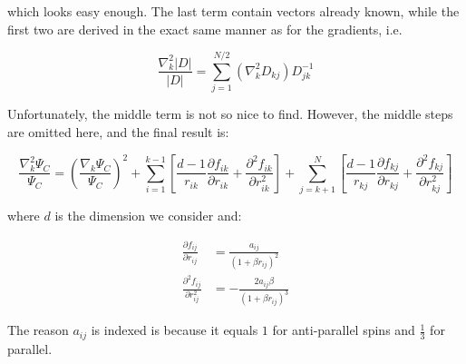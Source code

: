 \documentclass[english, a4paper]{article}
\begin{document}
which looks easy enough. The last term contain vectors already known, while the first two are derived in the exact same manner as for the gradients, i.e.

\begin{equation}
	\frac{\nabla_k^2|D|}{|D|} = \sum_{j=1}^{N/2}(\nabla_k^2D_{kj})D_{jk}^{-1}
\end{equation}

Unfortunately, the middle term is not so nice to find. However, the middle steps are omitted here, and the final result is:

\begin{equation}
	\frac{\nabla_k^2 \Psi_C}{\Psi_C} = \left(\frac{\nabla_k\Psi_C}{\Psi_C}\right)^2 + \sum_{i=1}^{k-1}\left[\frac{d-1}{r_{ik}}\frac{\partial f_{ik}}{\partial r_{ik}} + \frac{\partial^2 f_{ik}}{\partial r_{ik}^2}\right] + \sum_{j=k+1}^{N}\left[\frac{d-1}{r_{kj}}\frac{\partial f_{kj}}{\partial r_{kj}} + \frac{\partial^2 f_{kj}}{\partial r_{kj}^2}\right]
\end{equation}

where $d$ is the dimension we consider and:

\begin{align}
	\frac{\partial f_{ij}}{\partial r_{ij}} &= \frac{a_{ij}}{(1+\beta r_{ij})^2}\\
	\frac{\partial^2 f_{ij}}{\partial r_{ij}^2} &= -\frac{2a_{ij}\beta}{(1+\beta r_{ij})^3}
\end{align}

The reason $a_{ij}$ is indexed is because it equals $1$ for anti-parallel spins and $\frac{1}{3}$ for parallel.
\end{document}
